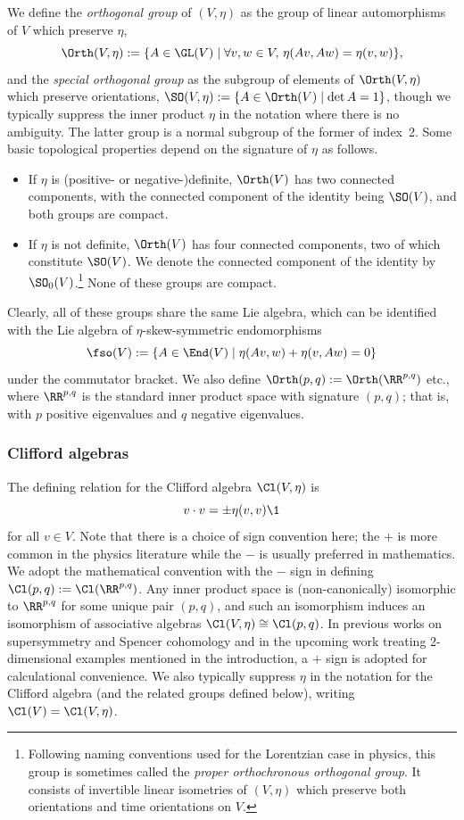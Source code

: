 We define the \emph{orthogonal group} of $(V,\eta)$ as the group of linear automorphisms of $V$ which preserve $\eta$,
\[
	\Orth(V,\eta) := \{A\in\GL(V) \mid \forall v,w\in V,\, \eta(Av,Aw) = \eta(v,w)\},
\]
and the \emph{special orthogonal group} as the subgroup of elements of $\Orth(V,\eta)$ which preserve orientations,
$\SO(V,\eta) := \{A\in \Orth(V) \mid \det A = 1\}$,
though we typically suppress the inner product $\eta$ in the notation where there is no ambiguity. The latter group is a normal subgroup of the former of index~2. Some basic topological properties depend on the signature of $\eta$ as follows.
\begin{itemize}\itemsep=0pt
	\item If $\eta$ is (positive- or negative-)definite, $\Orth(V)$ has two connected components, with the connected component of the identity being $\SO(V)$, and both groups are compact.
	\item If $\eta$ is not definite, $\Orth(V)$ has four connected components, two of which constitute $\SO(V)$. We denote the connected component of the identity by $\SO_0(V)$.\footnote{Following naming conventions used for the Lorentzian case in physics, this group is sometimes called the \emph{proper orthochronous orthogonal group}. It consists of invertible linear isometries of $(V,\eta)$ which preserve both orientations and time orientations on $V$.} None of these groups are compact.
\end{itemize}
Clearly, all of these groups share the same Lie algebra, which can be identified with the Lie algebra of $\eta$-skew-symmetric endomorphisms
\[
	\fso(V) := \{A\in\End(V) \mid \eta(Av,w) + \eta(v,Aw) = 0\}
\]
under the commutator bracket. We also define $\Orth(p,q):=\Orth(\RR^{p,q})$ etc., where $\RR^{p,q}$ is the standard inner product space with signature $(p,q)$; that is, with $p$ positive eigenvalues and $q$ negative eigenvalues.

\subsubsection{Clifford algebras}
\label{sec:clifford-algs}

The defining relation for the Clifford algebra $\Cl(V,\eta)$ is
\begin{equation}\label{eq:clifford-rel}
	v\cdot v = \pm\eta(v,v)\1
\end{equation}
for all $v\in V$. Note that there is a choice of sign convention here; the $+$ is more common in the physics literature while the $-$ is usually preferred in mathematics. We adopt the mathematical convention with the $-$ sign in defining $\Cl(p,q):=\Cl(\RR^{p,q})$. Any inner product space is (non-canonically) isomorphic to $\RR^{p,q}$ for some unique pair $(p,q)$, and such an isomorphism induces an isomorphism of associative algebras $\Cl(V,\eta)\cong \Cl(p,q)$. In previous works on supersymmetry and Spencer cohomology \cite{Beckett2021,deMedeiros2016,deMedeiros2018,Figueroa-OFarrill2017} and in the upcoming work treating 2-dimensional examples mentioned in the introduction, a $+$ sign is adopted for calculational convenience. We also typically suppress $\eta$ in the notation for the Clifford algebra (and the related groups defined below), writing $\Cl(V)=\Cl(V,\eta)$.

